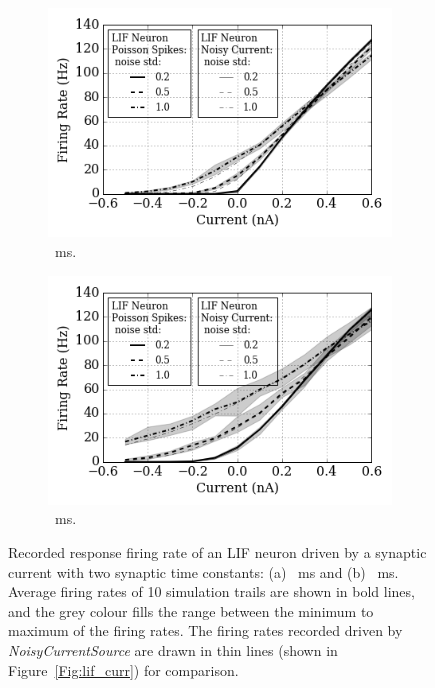 	\begin{figure}[tbp!]
		\centering
		\begin{subfigure}[t]{0.49\textwidth}
			\includegraphics[width=\textwidth]{pics_iconip/spiked_curve_1.png}
			\caption{\DIFdelbeginFL {}\DIFdelendFL \DIFaddbeginFL {}~ms.}
		\end{subfigure}
		\begin{subfigure}[t]{0.49\textwidth}
			\includegraphics[width=\textwidth]{pics_iconip/spiked_curve_10.png}
			\caption{\DIFdelbeginFL {}\DIFdelendFL \DIFaddbeginFL {}~ms.}
		\end{subfigure}
		\DIFdelbeginFL %
\DIFdelendFL \DIFaddbeginFL \caption[Recorded response firing rate driven by a synaptic current.]{\DIFaddendFL Recorded response firing rate of an LIF neuron driven by a synaptic current with two synaptic time constants: (a) \DIFdelbeginFL {}\DIFdelendFL \DIFaddbeginFL {}~ms and (b) \DIFdelbeginFL {}\DIFdelendFL \DIFaddbeginFL {}~ms. Average firing rates of 10 simulation trails are shown in bold lines, and the grey colour fills the range between the minimum to maximum of the firing rates. The firing rates recorded driven by \textit{NoisyCurrentSource} are drawn in thin lines (shown in Figure~\ref{Fig:lif_curr}) for comparison.}
		\label{Fig:spike_curr}
	\end{figure}

